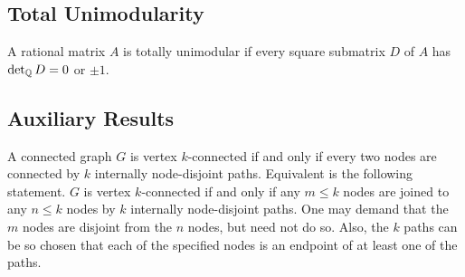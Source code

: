 \subsection{Total Unimodularity}

\begin{definition}[TU matrix]
  \label{def:tu_matrix}
  A rational matrix $A$ is totally unimodular if every square submatrix $D$ of $A$ has $\det_{\mathbb{Q}} D = 0$ or $\pm 1$.
\end{definition}



\subsection{Auxiliary Results}

\begin{theorem}
  \label{thm:Menger}
  A connected graph $G$ is vertex $k$-connected if and only if every two nodes are connected by $k$ internally node-disjoint paths.
  Equivalent is the following statement. $G$ is vertex $k$-connected if and only if any $m \leq k$ nodes are joined to any $n \leq k$ nodes by $k$ internally node-disjoint paths.
  One may demand that the $m$ nodes are disjoint from the $n$ nodes, but need not do so.
  Also, the $k$ paths can be so chosen that each of the specified nodes is an endpoint of at least one of the paths.
\end{theorem}

\begin{definition}
  \label{def:Delta_Y_exchange}
\end{definition}

\begin{definition}[gap]
  \label{def:gap}
\end{definition}
